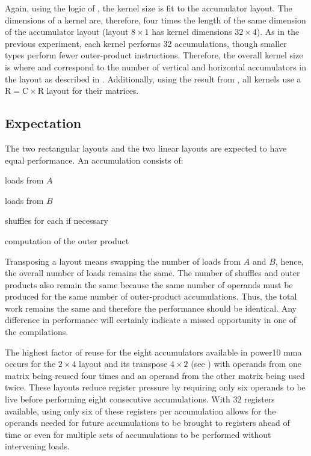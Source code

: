 \documentclass[\main/thesis.tex]{subfiles}
\begin{document}
Again, using the logic of , the kernel size is fit to the accumulator layout.
The dimensions of a kernel are, therefore, four times the length of the same dimension of the accumulator layout (\eg layout $8 \times 1$ has kernel dimensions $32 \times 4$).
As in the previous experiment, each kernel performs 32 accumulations, though smaller types perform fewer outer-product instructions.
Therefore, the overall kernel size is  where  and  correspond to the number of vertical and horizontal accumulators in the layout as described in .
Additionally, using the result from , all kernels use a $\textrm{R} = \textrm{C} \times \textrm{R}$ layout for their matrices.

\subsection{Expectation}
\label{sec:layoutExpectation}
The two rectangular layouts and the two linear layouts are expected to have equal performance.
An accumulation consists of:
\begin{enumerate*}[itemjoin={{; }}, itemjoin*={{; and finally }}, label={}, afterlabel={}, after={.}]
  \item loads from $A$
  \item loads from $B$
  \item shuffles for each if necessary
  \item computation of the outer product
\end{enumerate*}
Transposing a layout means swapping the number of loads from $A$ and $B$, hence, the overall number of loads remains the same.
The number of shuffles and outer products also remain the same because the same number of operands must be produced for the same number of outer-product accumulations.
Thus, the total work remains the same and therefore the performance should be identical.
Any difference in performance will certainly indicate a missed opportunity in one of the compilations.

The highest factor of reuse for the eight accumulators available in \gls{power10} \gls{mma} occurs for the $2 \times 4$ layout and its transpose $4 \times 2$ (see ) with operands from one matrix being reused four times and an operand from the other matrix being used twice.
These layouts reduce register pressure by requiring only six operands to be \gls{live} before performing eight consecutive accumulations.
With 32 registers available, using only six of these registers per accumulation allows for the operands needed for future accumulations to be brought to registers ahead of time or even for multiple sets of accumulations to be performed without intervening loads.
\end{document}
